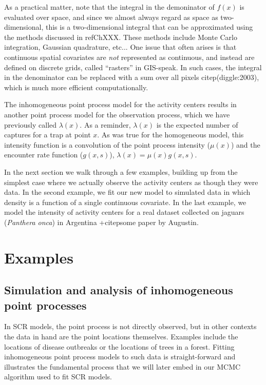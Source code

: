 As a practical matter, note that the integral in the
demoninator of $f(x)$ is evaluated over space, and since we almost always regard as
space as two-dimensional, this is a two-dimensional integral that can
be approximated using the methods discussed in ref{ChXXX}. These methods include
Monte Carlo integration, Gaussian quadrature, etc... One
issue that often arises is that continuous spatial covariates are
\emph{not} represented as continuous, and instead are
defined on discrete grids, called ``rasters'' in GIS-speak. In such
cases, the integral in the denominator can be replaced with a sum over
all pixels citep(diggle:2003), which is much more efficient
computationally.

The inhomogeneous point process model for the activity centers results
in another point process model for the
observation process, which we have previously called $\lambda(x)$. As
a reminder, $\lambda(x)$ is the expected number of captures for a trap
at point $x$. As was true for the homogeneous model, this
intensity function is a convolution of the point process intensity
($\mu(x)$) and the encounter rate function ($g(x,s)$),
$\lambda(x) = \mu(x) g(x,s)$.

In the next section we walk through a few examples, building up from
the simplest case where we actually observe the activity centers as
though they were data. In the second example, we fit our new model to simulated
data in which density is a function of a single continuous
covariate. In the last example, we model the intensity of activity
centers for a real dataset collected on jaguars (\emph{Panthera onca})
in Argentina +citep{some paper by Augustin}.

\section{Examples}

\subsection{Simulation and analysis of inhomogeneous point processes}

In SCR models, the point process is not directly observed, but in
other contexts the data in hand are the point locations
themselves. Examples include the locations of disease
outbreaks or the locations of trees in a forest. Fitting inhomogeneous
point process models to such data is straight-forward and illustrates
the fundamental process that we will later embed in our MCMC algorithm
used to fit SCR models.

